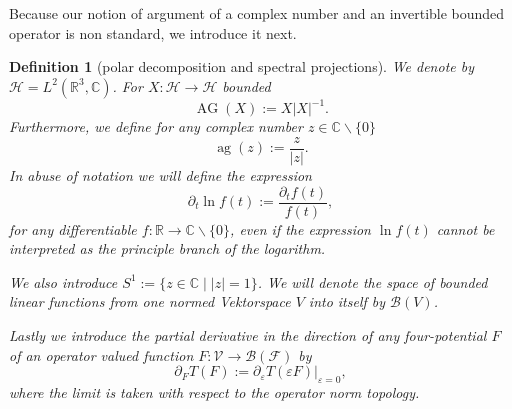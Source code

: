 \documentclass[b5paper,draft,openbib,12pt]{memoir}
\newtheorem{Def}{Definition}
\DeclareMathOperator{\ag}{ag}
\DeclareMathOperator{\AG}{AG}
\begin{document}
Because our notion of argument of a complex number and an 
invertible bounded operator is non standard, we introduce it next. 
\begin{Def}[polar decomposition and spectral projections]
We denote by \(\mathcal{H}=L^2(\mathbb{R}^3,\mathbb{C})\).
For \(X:\mathcal{H}\rightarrow \mathcal{H}\) bounded
\begin{equation}\label{def AG}
\AG(X):=X |X|^{-1}.
\end{equation}
Furthermore, we define for any complex number \(z\in \mathbb{C}\backslash \{0\}\)
\begin{equation}
\ag(z):=\frac{z}{|z|}.
\end{equation}
In abuse of notation we will define the expression
\begin{equation}
\partial_t \ln f(t):=\frac{\partial_t f(t)}{f(t)},
\end{equation}
for any differentiable \(f:\mathbb{R}\rightarrow \mathbb{C}\backslash \{0\} \), 
even if the expression \(\ln f(t)\) cannot be interpreted as the principle
branch of the logarithm.

We also introduce \(S^1:=\{z\in\mathbb{C}\mid |z|=1\}\).
We will denote the space of bounded linear functions from 
one normed Vektorspace \(V\) into itself by \(\mathcal{B}(V)\).

Lastly we introduce the partial derivative in 
the direction of any four-potential \(F\) of an operator valued 
function \(F:\mathcal{V}\rightarrow \mathcal{B}(\mathcal{F})\) by
\begin{equation}\label{def derivative}
\partial_F T(F):=\partial_{\varepsilon}T(\varepsilon F)|_{\varepsilon =0},
\end{equation}
where the limit is taken with respect to the operator norm topology.

\end{Def}
\end{document}
